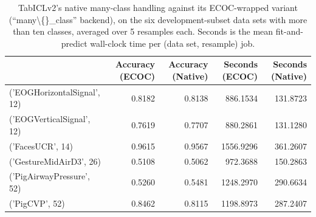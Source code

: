 \begin{table}[t]
\centering
\begin{tabular}{lrrrr}
\toprule
 & Accuracy (ECOC) & Accuracy (Native) & Seconds (ECOC) & Seconds (Native) \\
\midrule
('EOGHorizontalSignal', 12) & 0.8182 & 0.8138 & 886.1534 & 131.8723 \\
('EOGVerticalSignal', 12) & 0.7619 & 0.7707 & 880.2861 & 131.1280 \\
('FacesUCR', 14) & 0.9615 & 0.9567 & 1556.9296 & 361.2607 \\
('GestureMidAirD3', 26) & 0.5108 & 0.5062 & 972.3688 & 150.2863 \\
('PigAirwayPressure', 52) & 0.5260 & 0.5481 & 1248.2970 & 290.6634 \\
('PigCVP', 52) & 0.8462 & 0.8115 & 1198.8973 & 287.2407 \\
\bottomrule
\end{tabular}
\caption{TabICLv2's native many-class handling against its ECOC-wrapped variant (``many\textbackslash\{\}\_class'' backend), on the six development-subset data sets with more than ten classes, averaged over 5 resamples each. Seconds is the mean fit-and-predict wall-clock time per (data set, resample) job.}
\label{tab:multiclass-handling}
\end{table}